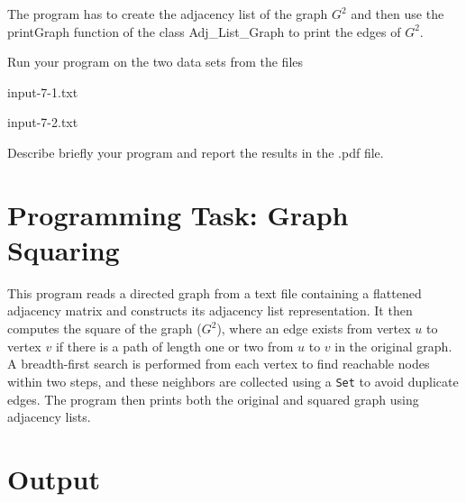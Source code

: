 \documentclass[11pt]{article}
\begin{document}
The program has to create the adjacency list of the graph $G^2$ and then use the \textsf{printGraph} function of the class \textsf{Adj\_List\_Graph} to print the edges of $G^2$.

Run your program on the two data sets from the files

input-7-1.txt 

input-7-2.txt

Describe briefly your program and report the results in the .pdf file.
\newpage
\section*{Programming Task: Graph Squaring}

This program reads a directed graph from a text file containing a flattened adjacency matrix and constructs its adjacency list representation. It then computes the square of the graph (\(G^2\)), where an edge exists from vertex \(u\) to vertex \(v\) if there is a path of length one or two from \(u\) to \(v\) in the original graph. A breadth-first search is performed from each vertex to find reachable nodes within two steps, and these neighbors are collected using a \texttt{Set} to avoid duplicate edges. The program then prints both the original and squared graph using adjacency lists.

\bigskip

\section*{Output}
\end{document}
